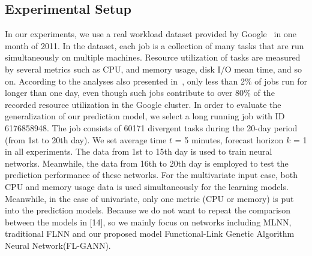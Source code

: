 \documentclass[conference]{IEEEtran}
\begin{document}
\subsection{Experimental Setup}
\label{experimental_setup}

In our experiments, we use a real workload dataset provided by Google~\cite{ref_google_trace} in one month of 2011. In the dataset, each job is a collection of many tasks that are run simultaneously on multiple machines. Resource utilization of tasks are measured by several metrics such as CPU, and memory usage, disk I/O mean time, and so on. According to the analyses also presented in~\cite{ref_google_trace}, only less than 2$\%$ of jobs run for longer than one day, even though such jobs contribute to over 80$\%$ of the recorded resource utilization in the Google cluster. In order to evaluate the generalization of our prediction model, we select a long running job with ID 6176858948. The job consists of 60171 divergent tasks during the 20-day period (from 1st to 20th day). We set average time $t$ = 5 minutes, forecast horizon $k$ = 1 in all experiments. The data from 1st to 15th day is used to train neural networks. Meanwhile, the data from 16th to 20th day is employed to test the prediction performance of these networks. For the multivariate input case, both CPU and memory usage data is used simultaneously for the learning models. Meanwhile, in the case of univariate, only one metric (CPU or memory) is put into the prediction models. Because we do not want to repeat the comparison between the models in [14], so we mainly focus on networks including MLNN, traditional FLNN and our proposed model Functional-Link Genetic Algorithm Neural Network(FL-GANN).
\end{document}
